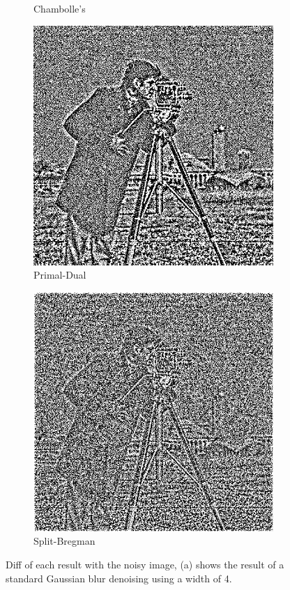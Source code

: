 \documentclass[11pt]{article}
\begin{document}
\begin{figure}
\begin{subfigure}[b]{0.4\textwidth}
\caption{Chambolle's}
\label{camera:ch:diff}
\end{subfigure}
\begin{subfigure}[b]{0.4\textwidth}
\centering
\includegraphics[width=\textwidth]{camera_pd_diff}
\caption{Primal-Dual}
\label{camera:pd:diff}
\end{subfigure}
\begin{subfigure}[b]{0.4\textwidth}
\centering
\includegraphics[width=\textwidth]{camera_sb_diff}
\caption{Split-Bregman}
\label{camera:sb:diff}
\end{subfigure}
\caption{Diff of each result with the noisy image, (a) shows the result of a standard Gaussian blur denoising using a width of 4.}
\label{fig:cameraman:diff}
\end{figure}
\end{document}
